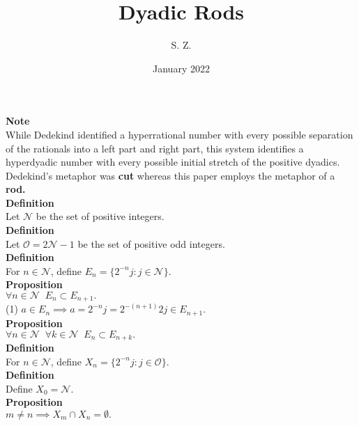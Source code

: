 \documentclass{article}
\title{Dyadic Rods}
\author{S. Z. }
\date{January 2022}
\newcommand{\odds}{ \mathscr{O}}
\newcommand{\disjoints}{ X}
\newcommand{\nondisjoints}{E}
\newcommand{\naturals}{ \mathscr{N}}
\newcommand{\elt}{a}
\newcommand{\odds}{ \mathscr{O}}
\begin{document}
\maketitle



\textbf{Note}\\
While Dedekind identified a hyperrational number with every possible separation of the rationals into a left part and right part, this system identifies a hyperdyadic number with every possible initial stretch of the positive dyadics. Dedekind's metaphor was \textbf{cut} whereas this paper employs the metaphor of a \textbf{rod.} \\


\textbf{Definition}\\
Let $\naturals $ be the set of positive integers.\\

\textbf{Definition}\\
Let $\odds = 2\naturals - 1 $ be the set of positive odd integers.\\

\textbf{Definition}\\
For $n \in \naturals$, define  $\nondisjoints_n = \{ 2^{-n}j : j \in \naturals \}$. \\

\textbf{Proposition}\\
$\forall n \in \naturals \;\; \nondisjoints_n \subset \nondisjoints_{n+1}.$\\

(1) $\elt \in \nondisjoints_n \implies \elt = 2^{-n}j = 2^{-(n+1)}2j \in \nondisjoints_{n+1}$.\\

\textbf{Proposition}\\
$\forall n \in \naturals \;\; \forall k \in \naturals \;\; \nondisjoints_n \subset \nondisjoints_{n+k}.$\\

\textbf{Definition}\\
For  $n \in \naturals$, define $\disjoints_n = \{2^{-n} j : j \in \odds \}$.\\

\textbf{Definition}\\
Define $\disjoints_0 = \naturals$.\\

\textbf{Proposition}\\
$m \ne n \implies \disjoints_m \cap \disjoints_n = \emptyset.$\\
\end{document}

